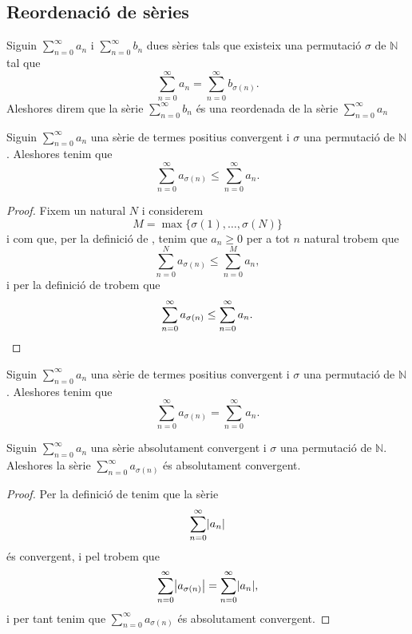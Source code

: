 \documentclass[../../Main.tex]{subfiles}
\begin{document}
	\subsection{Reordenació de sèries}
	\begin{definition}
		\label{def:reordenada d'una sèrie}
		Siguin \(\sum_{n=0}^{\infty}a_{n}\) i \(\sum_{n=0}^{\infty}b_{n}\) dues sèries tals que existeix una permutació \(\sigma\) de \(\mathbb{N}\) tal que
		\[\sum_{n=0}^{\infty}a_{n}=\sum_{n=0}^{\infty}b_{\sigma(n)}.\]
		Aleshores direm que la sèrie \(\sum_{n=0}^{\infty}b_{n}\) és una reordenada de la sèrie \(\sum_{n=0}^{\infty}a_{n}\)
	\end{definition}
	\begin{lemma}
		\label{lema:la reordenada d'una sèrie de termes positius convergent és més petita que la sèrie}
		Siguin \(\sum_{n=0}^{\infty}a_{n}\) una sèrie de termes positius convergent i \(\sigma\) una permutació de \(\mathbb{N}\). Aleshores tenim que
		\[\sum_{n=0}^{\infty}a_{\sigma(n)}\leq\sum_{n=0}^{\infty}a_{n}.\]
		\begin{proof}
			Fixem un natural \(N\) i considerem
			\[M=\max\{\sigma(1),\dots,\sigma(N)\}\]
			i com que, per la definició de , tenim que \(a_{n}\geq0\) per a tot \(n\) natural trobem que
			\[\sum_{n=0}^{N}a_{\sigma(n)}\leq\sum_{n=0}^{M}a_{n},\]
			i per la definició de  trobem que
			\[\sum_{n=0}^{\infty}a_{\sigma(n)}\leq\sum_{n=0}^{\infty}a_{n}.\qedhere\]
		\end{proof}
	\end{lemma}
	\begin{corollary}
		\label{cor:la reordenada d'una sèrie de termes positius convergent conserva la sèrie}
		Siguin \(\sum_{n=0}^{\infty}a_{n}\) una sèrie de termes positius convergent i \(\sigma\) una permutació de \(\mathbb{N}\). Aleshores tenim que
		\[\sum_{n=0}^{\infty}a_{\sigma(n)}=\sum_{n=0}^{\infty}a_{n}.\]
	\end{corollary}
	\begin{proposition}
		\label{prop:la reordenada d'una sèrie absolutament convergent és absolutament convergent}
		Siguin \(\sum_{n=0}^{\infty}a_{n}\) una sèrie absolutament convergent i \(\sigma\) una permutació de \(\mathbb{N}\). Aleshores la sèrie \(\sum_{n=0}^{\infty}a_{\sigma(n)}\) és absolutament convergent.
		\begin{proof}
			Per la definició de  tenim que la sèrie
			\[\sum_{n=0}^{\infty}\abs{a_{n}}\]
			és convergent, i pel \corollari{}  trobem que
			\[\sum_{n=0}^{\infty}\abs{a_{\sigma(n)}}=\sum_{n=0}^{\infty}\abs{a_{n}},\]
			i per tant tenim que \(\sum_{n=0}^{\infty}a_{\sigma(n)}\) és absolutament convergent.
		\end{proof}
	\end{proposition}
\end{document}
